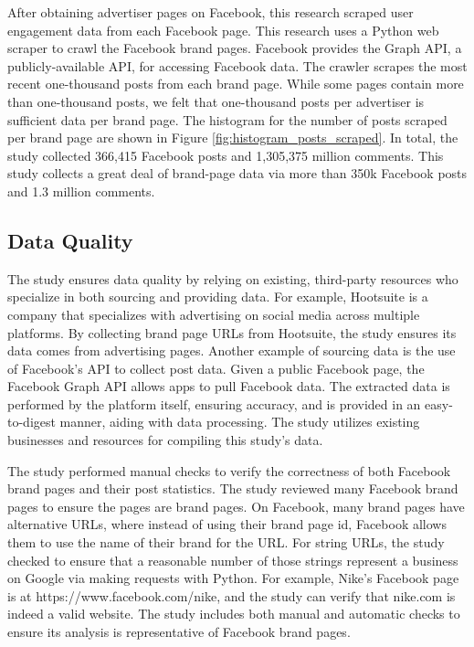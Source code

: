 \documentclass[mksc,blindrev]{informs3} %
\begin{document}
After obtaining advertiser pages on Facebook, this research scraped user engagement data from each Facebook page. This research uses a Python web scraper to crawl the Facebook brand pages. Facebook provides the Graph API, a publicly-available API, for accessing Facebook data. The crawler scrapes the most recent one-thousand posts from each brand page. While some pages contain more than one-thousand posts, we felt that one-thousand posts per advertiser is sufficient data per brand page. The histogram for the number of posts scraped per brand page are shown in Figure \ref{fig:histogram_posts_scraped}. In total, the study collected 366,415 Facebook posts and 1,305,375 million comments. This study collects a great deal of brand-page data via more than 350k Facebook posts and 1.3 million comments.

\subsection{Data Quality}

The study ensures data quality by relying on existing, third-party resources who specialize in both sourcing and providing data. For example, Hootsuite is a company that specializes with advertising on social media across multiple platforms. By collecting brand page URLs from Hootsuite, the study ensures its data comes from advertising pages. Another example of sourcing data is the use of Facebook's API to collect post data. Given a public Facebook page, the Facebook Graph API allows apps to pull Facebook data. The extracted data is performed by the platform itself, ensuring accuracy, and is provided in an easy-to-digest manner, aiding with data processing. The study utilizes existing businesses and resources for compiling this study's data.

The study performed manual checks to verify the correctness of both Facebook brand pages and their post statistics. The study reviewed many Facebook brand pages to ensure the pages are brand pages. On Facebook, many brand pages have alternative URLs, where instead of using their brand page id, Facebook allows them to use the name of their brand for the URL. For string URLs, the study checked to ensure that a reasonable number of those strings represent a business on Google via making requests with Python. For example, Nike's Facebook page is at https://www.facebook.com/nike, and the study can verify that nike.com is indeed a valid website. The study includes both manual and automatic checks to ensure its analysis is representative of Facebook brand pages.
\end{document}
